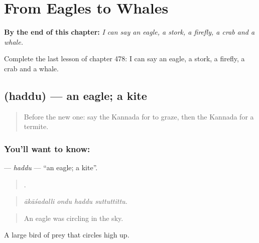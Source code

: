 
\chapter{From Eagles to Whales}
\label{ch:ka-from-eagles-to-whales}

\begin{chapteropening}
\textbf{By the end of this chapter:} \emph{I can say an eagle, a stork, a firefly, a crab and a whale.}

Complete the last lesson of chapter 478: I can say an eagle, a stork, a firefly, a crab and a whale.
\end{chapteropening}

\section[\texorpdfstring{\kn{ಹದ್ದು} (haddu)}{ಹದ್ದು (haddu)}]{ (haddu) — an eagle; a kite}

\label{lesson:KA-C478-haddu}



\begin{quote}
Before the new one: say the Kannada for to graze, then the Kannada for a termite.
\end{quote}

\subsection*{You'll want to know: }
\textbf{} — \emph{haddu} — \textquotedblleft{}an eagle; a kite\textquotedblright{}.

\begin{quote}
   .
\end{quote}

\begin{quote}
\emph{ākāśadalli ondu haddu suttuttittu.}
\end{quote}

\begin{quote}
An eagle was circling in the sky.
\end{quote}

A large bird of prey that circles high up.

